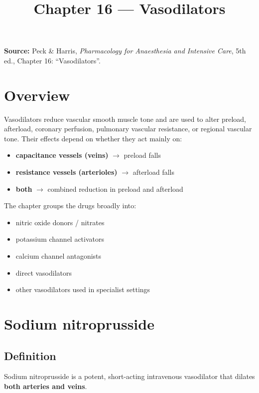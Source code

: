 \documentclass[11pt,a4paper]{article}
\title{Chapter 16 --- Vasodilators}
\author{}
\date{}
\begin{document}
\maketitle

\noindent \textbf{Source:} Peck \& Harris, \textit{Pharmacology for Anaesthesia and Intensive Care}, 5th ed., Chapter 16: ``Vasodilators''.

\tableofcontents

\section{Overview}

Vasodilators reduce vascular smooth muscle tone and are used to alter preload, afterload, coronary perfusion, pulmonary vascular resistance, or regional vascular tone. Their effects depend on whether they act mainly on:
\begin{itemize}
    \item \textbf{capacitance vessels (veins)} $\rightarrow$ preload falls
    \item \textbf{resistance vessels (arterioles)} $\rightarrow$ afterload falls
    \item \textbf{both} $\rightarrow$ combined reduction in preload and afterload
\end{itemize}

The chapter groups the drugs broadly into:
\begin{itemize}
    \item nitric oxide donors / nitrates
    \item potassium channel activators
    \item calcium channel antagonists
    \item direct vasodilators
    \item other vasodilators used in specialist settings
\end{itemize}

\section{Sodium nitroprusside}

\subsection{Definition}

Sodium nitroprusside is a potent, short-acting intravenous vasodilator that dilates \textbf{both arteries and veins}.
\end{document}
